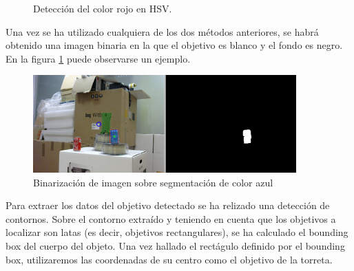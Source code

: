 \begin{figure}[h]
\centering
{}

\caption{Detección del color rojo en HSV.}

\end{figure}
\FloatBarrier

Una vez se ha utilizado cualquiera de los dos métodos anteriores, se habrá obtenido una imagen binaria en la que el objetivo es blanco y el fondo es negro. En la figura \ref{binaria} puede observarse un ejemplo.\\

\begin{figure}[h]
\centering
\includegraphics[width=0.9\textwidth]{images/binaria}%
\caption{Binarización de imagen sobre segmentación de color azul}
\label{binaria}
\end{figure}
\FloatBarrier

Para extraer los datos del objetivo detectado se ha relizado una detección de contornos. Sobre el contorno extraído y teniendo en cuenta que los objetivos a localizar son latas (es decir, objetivos rectangulares), se ha calculado el bounding box del cuerpo del objeto. Una vez hallado el rectágulo definido por el bounding box, utilizaremos las coordenadas de su centro como el objetivo de la torreta.

